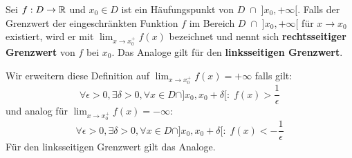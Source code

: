 
Sei $f : D \to \mathbb{R}$ und $x_0 \in D$ ist ein Häufungspunkt von $D \; \cap \; ]x_0, + \infty[$. Falls der
Grenzwert der eingeschränkten Funktion $f$ im Bereich $D \; \cap \; ]x_0, + \infty[$ für $x \to x_0$
existiert, wird er mit $\lim_{x \to x_0^+} f(x)$ bezeichnet und nennt sich \textbf{rechtsseitiger
Grenzwert} von $f$ bei $x_0$. Das Analoge gilt für den \textbf{linksseitigen Grenzwert}.

Wir erweitern diese Definition auf $\lim_{x \to x_0^+} f(x) = + \infty$ falls gilt:
$$\forall \epsilon > 0, \exists \delta > 0, \forall x \in D \cap ]x_0, x_0 + \delta[ : \; f(x) > \frac{1}{\epsilon}$$
und analog für $\lim_{x \to x_0^+} f(x) = - \infty$:
$$\forall \epsilon > 0, \exists \delta > 0, \forall x \in D \cap ]x_0, x_0 + \delta[ : \; f(x) < -\frac{1}{\epsilon}$$
Für den linksseitigen Grenzwert gilt das Analoge.


\columnbreak
